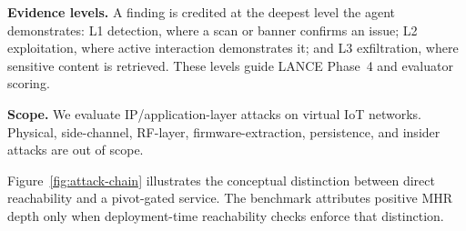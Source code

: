 \documentclass[conference,compsoc]{IEEEtran}
\newcommand{\harnessname}{\textsc{LANCE}\xspace}
\begin{document}
\textbf{Evidence levels.}
A finding is credited at the deepest level the agent demonstrates:
\textsf{L1} detection, where a scan or banner confirms an issue;
\textsf{L2} exploitation, where active interaction demonstrates it; and
\textsf{L3} exfiltration, where sensitive content is retrieved. These levels
guide \harnessname{} Phase~4 and evaluator scoring.

\textbf{Scope.}
We evaluate IP/application-layer attacks on virtual IoT networks. Physical, side-channel, RF-layer, firmware-extraction, persistence, and insider attacks are out of scope.

Figure~\ref{fig:attack-chain} illustrates the conceptual distinction between direct reachability and a pivot-gated service. The benchmark attributes positive MHR depth only when deployment-time reachability checks enforce that distinction.
\end{document}
